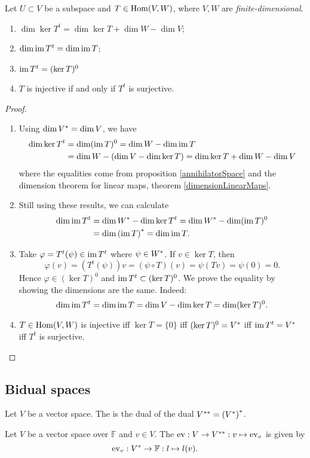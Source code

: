 \begin{proposition}
Let $U\subset V$ be a subspace and $T\in \operatorname{Hom}(V,W)$, where $V,W$ are \emph{finite-dimensional}.
\begin{enumerate}
\item $\dim\ker T^t = \dim \ker T + \dim W - \dim V$;
\item $\dim\operatorname{im} T^t = \dim \operatorname{im} T$;
\item $\operatorname{im} T^t = (\ker T)^0$
\item $T$ is injective \textup{if and only if} $T^t$ is surjective.
\end{enumerate}
\end{proposition}
\begin{proof}
\mbox{}
\begin{enumerate}
\item Using $\dim {V}^* = \dim V$, we have
\begin{align*}
\dim \ker T^t &= \dim(\operatorname{im} T)^0 = \dim W-\dim \operatorname{im} T \\
&= \dim W - (\dim V - \dim \ker T) = \dim \ker T + \dim W - \dim V
\end{align*}
where the equalities come from proposition \ref{annihilatorSpace} and the dimension theorem for linear maps, theorem \ref{dimensionLinearMaps}.
\item Still using these results, we can calculate
\begin{align*}
\dim \operatorname{im} T^t &= \dim {W}^* - \dim \ker T^t = \dim {W}^* - \dim (\operatorname{im} T)^0 \\
&= \dim {(\operatorname{im}T)}^* = \dim \operatorname{im} T.
\end{align*}
\item Take $\varphi = T^t(\psi) \in \operatorname{im} T^t$ where $\psi \in {W}^*$. If $v\in \ker T$, then
\[ \varphi(v) = \left(T^t(\psi)\right)v = (\psi\circ T)(v) = \psi(Tv) = \psi(0) = 0. \]
Hence $\varphi \in (\ker T)^0$ and $\operatorname{im} T^t\subset (\ker T)^0$. We prove the equality by showing the dimensions are the same. Indeed:
\[ \dim \operatorname{im} T^t = \dim \operatorname{im} T = \dim V - \dim \ker T = \dim(\ker T)^0. \]
\item $T\in\operatorname{Hom}(V,W)$ is injective iff $\ker T = \{0\}$ iff $(\ker T)^0 = {V}^*$ iff $\operatorname{im} T^t = {V}^*$ iff $T^t$ is surjective.
\end{enumerate}
\end{proof}
\subsection{Bidual spaces}
\begin{definition}
Let $V$ be a vector space. The  is the dual of the dual ${V}^{**} = {({V}^*)}^*$.
\end{definition}
\begin{definition}
Let $V$ be a vector space over $\mathbb{F}$ and $v\in V$. The  $\operatorname{ev}: V\to {V}^{**}: v\mapsto \operatorname{ev}_v$ is given by
\[ \operatorname{ev}_v: {V}^* \to \mathbb{F}: l\mapsto l(v). \]
\end{definition}

